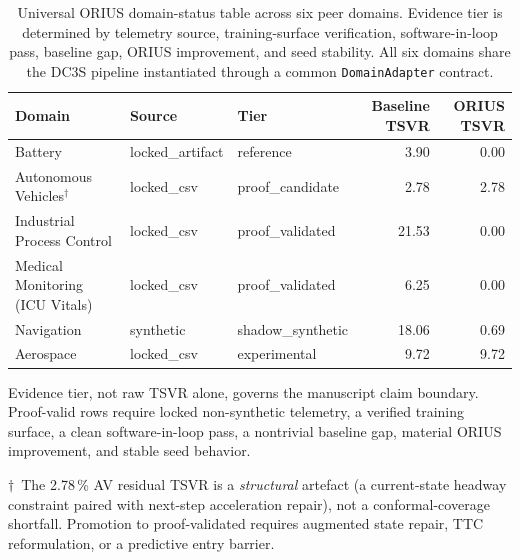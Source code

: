 \begin{table}[htbp]
\centering
\caption{Universal ORIUS domain-status table across six peer domains.
Evidence tier is determined by telemetry source, training-surface verification,
software-in-loop pass, baseline gap, ORIUS improvement, and seed stability.
All six domains share the DC3S pipeline instantiated through a common
\texttt{DomainAdapter} contract.}
\label{tab:domain-validation-summary}
\begin{tabular}{lllr r}
\toprule
Domain & Source & Tier & Baseline TSVR & ORIUS TSVR \\
\midrule
Battery & locked\_artifact & reference & 3.90 & 0.00 \\
Autonomous Vehicles$^\dagger$ & locked\_csv & proof\_candidate & 2.78 & 2.78 \\
Industrial Process Control & locked\_csv & proof\_validated & 21.53 & 0.00 \\
Medical Monitoring (ICU Vitals) & locked\_csv & proof\_validated & 6.25 & 0.00 \\
Navigation & synthetic & shadow\_synthetic & 18.06 & 0.69 \\
Aerospace & locked\_csv & experimental & 9.72 & 9.72 \\
\bottomrule
\end{tabular}
\smallskip
\begin{minipage}{0.95\linewidth}\footnotesize
Evidence tier, not raw TSVR alone, governs the manuscript claim boundary.
Proof-valid rows require locked non-synthetic telemetry, a verified
training surface, a clean software-in-loop pass, a nontrivial baseline
gap, material ORIUS improvement, and stable seed behavior.

$\dagger$~The 2.78\,\% AV residual TSVR is a \emph{structural} artefact
(a current-state headway constraint paired with next-step acceleration repair),
not a conformal-coverage shortfall.  Promotion to proof-validated requires
augmented state repair, TTC reformulation, or a predictive entry barrier.
\end{minipage}
\end{table}
